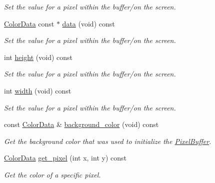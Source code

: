 \begin{DoxyCompactItemize}
\begin{DoxyCompactList}\small\item\em Set the value for a pixel within the buffer/on the screen. \end{DoxyCompactList}\item 
\hyperlink{classimage__tools_1_1ColorData}{Color\+Data} const $\ast$ \hyperlink{classimage__tools_1_1PixelBuffer_a2450a6c464bbe620d9efec2ac6c82a9e}{data} (void) const \hypertarget{classimage__tools_1_1PixelBuffer_a2450a6c464bbe620d9efec2ac6c82a9e}{}\label{classimage__tools_1_1PixelBuffer_a2450a6c464bbe620d9efec2ac6c82a9e}

\begin{DoxyCompactList}\small\item\em Set the value for a pixel within the buffer/on the screen. \end{DoxyCompactList}\item 
int \hyperlink{classimage__tools_1_1PixelBuffer_a37fa2f4abc4c1d28a063c3c74b1faf9d}{height} (void) const \hypertarget{classimage__tools_1_1PixelBuffer_a37fa2f4abc4c1d28a063c3c74b1faf9d}{}\label{classimage__tools_1_1PixelBuffer_a37fa2f4abc4c1d28a063c3c74b1faf9d}

\begin{DoxyCompactList}\small\item\em Set the value for a pixel within the buffer/on the screen. \end{DoxyCompactList}\item 
int \hyperlink{classimage__tools_1_1PixelBuffer_a6143b06b081402013a5f346222b2ab5f}{width} (void) const \hypertarget{classimage__tools_1_1PixelBuffer_a6143b06b081402013a5f346222b2ab5f}{}\label{classimage__tools_1_1PixelBuffer_a6143b06b081402013a5f346222b2ab5f}

\begin{DoxyCompactList}\small\item\em Set the value for a pixel within the buffer/on the screen. \end{DoxyCompactList}\item 
const \hyperlink{classimage__tools_1_1ColorData}{Color\+Data} \& \hyperlink{classimage__tools_1_1PixelBuffer_a56ac2b6b21368d04a71d6a615eebdd33}{background\+\_\+color} (void) const 
\begin{DoxyCompactList}\small\item\em Get the background color that was used to initialize the \hyperlink{classimage__tools_1_1PixelBuffer}{Pixel\+Buffer}. \end{DoxyCompactList}\item 
\hyperlink{classimage__tools_1_1ColorData}{Color\+Data} \hyperlink{classimage__tools_1_1PixelBuffer_af1a9e6d73a1a1fde15e4dbeff335c376}{get\+\_\+pixel} (int x, int y) const 
\begin{DoxyCompactList}\small\item\em Get the color of a specific pixel. \end{DoxyCompactList}\end{DoxyCompactItemize}
